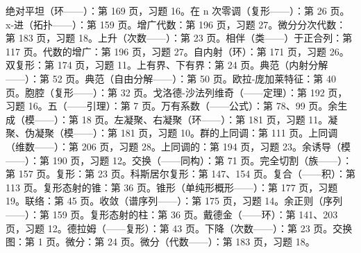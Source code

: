 
绝对平坦（环——）：第 169 页，习题 16。在 n 次零调（复形——）：第 26 页。x-进（拓扑——）：第 159 页。增广代数：第 196 页，习题 27。微分分次代数：第 183 页，习题 18。上升（次数——）：第 23 页。相伴（类——）于正合列：第 117 页。代数的增广：第 196 页，习题 27。自内射（环）：第 171 页，习题 26。双复形：第 174 页，习题 11。上有界、下有界：第 24 页。典范（内射分解——）：第 52 页。典范（自由分解——）：第 50 页。欧拉-庞加莱特征：第 40 页。胞腔（复形——）：第 32 页。戈洛德-沙法列维奇（——定理）：第 192 页，习题 16。五（——引理）：第 7 页。万有系数（——公式）：第 78、99 页。余生成（模——）：第 18 页。左凝聚、右凝聚（环——）：第 181 页，习题 11。凝聚、伪凝聚（模——）：第 181 页，习题 10。群的上同调：第 111 页。上同调（维数——）：第 206 页，习题 28。上同调的：第 194 页，习题 23。余诱导（模——）：第 190 页，习题 12。交换（——同构）：第 71 页。完全切割（族——）：第 157 页。复形：第 23 页。科斯居尔复形：第 147、154 页。复合（——积）：第 113 页。复形态射的锥：第 36 页。锥形（单纯形概形——）：第 177 页，习题 19。联络：第 45 页。收敛（谱序列——）：第 175 页，习题 14。余正则（序列——）：第 159 页。复形态射的柱：第 36 页。戴德金（——环）：第 141、203 页，习题 12。德拉姆（——复形）：第 43 页。下降（次数——）：第 23 页。交换图：第 1 页。微分：第 24 页。微分（代数——）：第 183 页，习题 18。


